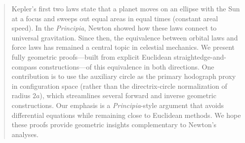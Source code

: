 \begin{abstract}
  Kepler's first two laws state that a planet moves on an ellipse with the Sun at a focus and sweeps out equal areas in equal times (constant areal speed). In the \emph{Principia}, Newton showed how these laws connect to universal gravitation. Since then, the equivalence between orbital laws and force laws has remained a central topic in celestial mechanics. We present fully geometric proofs---built from explicit Euclidean straightedge-and-compass constructions---of this equivalence in both directions. One contribution is to use the auxiliary circle as the primary hodograph proxy in configuration space (rather than the directrix-circle normalization of radius \(2a\)), which streamlines several forward and inverse geometric constructions. Our emphasis is a \emph{Principia}-style argument that avoids differential equations while remaining close to Euclidean methods. We hope these proofs provide geometric insights complementary to Newton's analyses.
\end{abstract}
